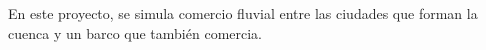 En este proyecto, se simula comercio fluvial entre las ciudades que forman la cuenca y un barco que también comercia. 